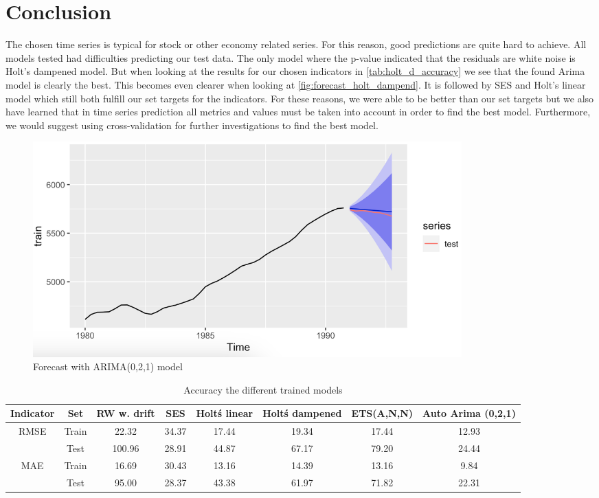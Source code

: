 \documentclass[10pt]{article}
\begin{document}
\section{Conclusion}
The chosen time series is typical for stock or other economy related series. For this reason, good predictions are quite hard to achieve. All models tested had difficulties predicting our test data. The only model where the p-value indicated that the residuals are white noise is Holt's dampened model. But when looking at the results for our chosen indicators in \autoref{tab:holt_d_accuracy} we see that the found Arima model is clearly the best. This becomes even clearer when looking at \autoref{fig:forecast_holt_dampend}. It is followed by SES and Holt's linear model which still both fulfill our set targets for the indicators. For these reasons, we were able to be better than our set targets but we also have learned that in time series prediction all metrics and values must be taken into account in order to find the best model. Furthermore, we would suggest using cross-validation for further investigations to find the best model.
\begin{figure}[ht!]
    \centering
    \includegraphics[width=0.8\textwidth]{img/forecast_arima.png}
    \caption{Forecast with ARIMA(0,2,1) model}
    \label{fig:forecast_holt_dampend}
\end{figure}



\begin{table}[h]
\small
\centering
\begin{tabular}{cccccccc}
  \hline
 Indicator & Set & RW w. drift & SES & Holt\'s linear & Holt\'s dampened & ETS(A,N,N) & Auto Arima (0,2,1)  \\ 
  \hline
\multirow{2}{*}{RMSE} & Train & 22.32  & 34.37 & 17.44 & 19.34 & 17.44 & 12.93 \\ 
  & Test & 100.96 & 28.91 & 44.87 & 67.17 & 79.20 & 24.44 \\
  \hline 
  \multirow{2}{*}{MAE} & Train &  16.69 & 30.43 & 13.16 & 14.39 & 13.16 & 9.84 \\ 
  & Test & 95.00 & 28.37 & 43.38 & 61.97 & 71.82 & 22.31 \\ 
   \hline
\end{tabular}
\caption{Accuracy the different trained models}
\label{tab:holt_d_accuracy}
\end{table}
\clearpage

\printbibliography
\end{document}
